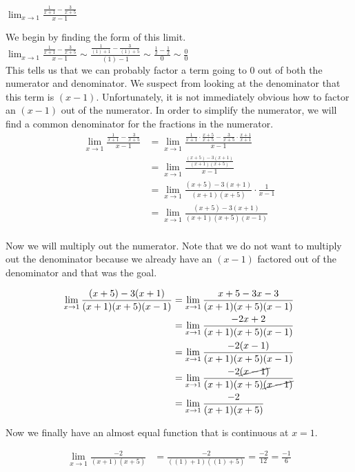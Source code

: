 \documentclass{ximera}
\begin{document}
\begin{example}
$\lim_{x\to 1} \frac{\frac{1}{x+1}-\frac{3}{x+5}}{x-1}$
\begin{solution}
We begin by finding the form of this limit. \\
$\lim_{x\to 1} \frac{\frac{1}{x+1}-\frac{3}{x+5}}{x-1} \sim \frac{\frac{1}{(1)+1}-\frac{3}{(1)+5}}{(1)-1} \sim \frac{\frac{1}{2}-\frac{1}{2}}{0} \sim \frac{0}{0}$ \\
This tells us that we can probably factor a term going to 0 out of both the numerator and denominator.  We suspect from looking at the denominator that this term is $(x-1)$.  Unfortunately, it is not immediately obvious how to factor an $(x-1)$ out of the numerator.  In order to simplify the numerator, we will find a common denominator for the fractions in the numerator.
\begin{align}
\lim_{x\to 1} \frac{\frac{1}{x+1}-\frac{3}{x+5}}{x-1}  &= \lim_{x\to 1} \frac{\frac{1}{x+1} \cdot \frac{x+5}{x+5}-\frac{3}{x+5} \cdot \frac{x+1}{x+1}}{x-1}\\
&= \lim_{x\to 1} \frac{\frac{(x+5)-3(x+1)}{(x+1)(x+5)}}{x-1}\\
&= \lim_{x\to 1}\frac{(x+5)-3(x+1)}{(x+1)(x+5)} \cdot \frac{1}{x-1}\\
&= \lim_{x\to 1}\frac{(x+5)-3(x+1)}{(x+1)(x+5)(x-1)}\\
\end{align}

Now we will multiply out the numerator.  Note that we do not want to multiply out the denominator because we already have an $(x-1)$ factored out of the denominator and that was the goal.

\begin{align}
\lim_{x\to 1}\frac{(x+5)-3(x+1)}{(x+1)(x+5)(x-1)} &= \lim_{x\to 1}\frac{x+5-3x-3}{(x+1)(x+5)(x-1)} \\
&= \lim_{x\to 1}\frac{-2x+2}{(x+1)(x+5)(x-1)}\\
&= \lim_{x\to 1}\frac{-2(x-1)}{(x+1)(x+5)(x-1)}\\
&= \lim_{x\to 1}\frac{-2\cancel{(x-1)}}{(x+1)(x+5)\cancel{(x-1)}}\\
&= \lim_{x\to 1}\frac{-2}{(x+1)(x+5)}
\end{align}
  
Now we finally have an almost equal function that is continuous at $x=1$.

\begin{align}
\lim_{x\to 1}\frac{-2}{(x+1)(x+5)} &= \frac{-2}{((1)+1)((1)+5)} = \frac{-2}{12} = \frac{-1}{6}
\end{align}
\end{solution}
\end{example}
\end{document}

